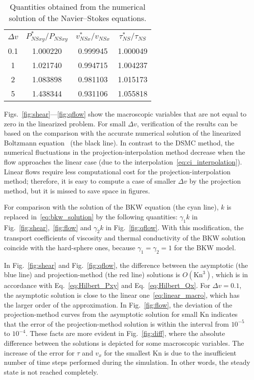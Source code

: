 \documentclass[review]{elsarticle}
\newcommand{\Kn}{\mathrm{Kn}}
\newcommand{\NS}{N\!S}
\newcommand{\OO}[1]{O(#1)}
\begin{document}
\begin{table}
    \centering
    \begin{tabular}{cccc}
        \(\Delta{v}\) & \(\displaystyle P_{\NS xy}^*/P_{\NS xy}\) & \(\displaystyle v_{\NS x}^*/v_{\NS x}\) & \(\displaystyle \tau_{\NS}^*/\tau_{\NS}\) \\[3pt]
        0.1 & 1.000220 & 0.999945 & 1.000049 \\
          1 & 1.021740 & 0.994715 & 1.004237 \\
          2 & 1.083898 & 0.981103 & 1.015173 \\
          5 & 1.438344 & 0.931106 & 1.055818 \\
    \end{tabular}
    \caption{Quantities obtained from the numerical solution of the Navier--Stokes equations.}
    \label{table:NS_params}
\end{table}

Figs.~\ref{fig:shear}---\ref{fig:qflow} show the macroscopic variables
that are not equal to zero in the linearized problem.
For small \(\Delta{v}\), verification of the results can be based
on the comparison with the accurate numerical solution of
the linearized Boltzmann equation~\citep{Ohwada1990} (the black line).
In contrast to the DSMC method, the numerical fluctuations in the projection-interpolation method
decrease when the flow approaches the linear case (due to the interpolation~\eqref{eq:ci_interpolation}).
Linear flows require less computational cost for the projection-interpolation method;
therefore, it is easy to compute a case of smaller \(\Delta{v}\) by the projection method,
but it is missed to save space in figures.

For comparison with the solution of the BKW equation (the cyan line),
\(k\) is replaced in~\eqref{eq:bkw_solution} by the following quantities:
\(\gamma_1k\) in Fig.~\ref{fig:shear},~\ref{fig:flow} and \(\gamma_2k\) in Fig.~\ref{fig:qflow}.
With this modification, the transport coefficients of viscosity and thermal conductivity
of the BKW solution coincide with the hard-sphere ones, because \(\gamma_1=\gamma_2=1\) for the BKW model.

In Fig.~\ref{fig:shear} and Fig.~\ref{fig:qflow}, the difference between the asymptotic (the blue line)
and projection-method (the red line) solutions is \(\OO{\Kn^3}\),
which is in accordance with Eq.~\eqref{eq:Hilbert_Pxy} and Eq.~\eqref{eq:Hilbert_Qx}.
For \(\Delta{v}=0.1\), the asymptotic solution is close to the linear one~\eqref{eq:linear_macro},
which has the larger order of the approximation.
In Fig.~\ref{fig:flow}, the deviation of the projection-method curves
from the asymptotic solution for small \(\Kn\) indicates that
the error of the projection-method solution is within the interval from \(10^{-5}\) to \(10^{-4}\).
These facts are more evident in Fig.~\ref{fig:diff},
where the absolute difference between the solutions
is depicted for some macroscopic variables.
The increase of the error for \(\tau\) and \(v_x\) for the smallest \(\Kn\)
is due to the insufficient number of time steps performed during the simulation.
In other words, the steady state is not reached completely.
\end{document}
